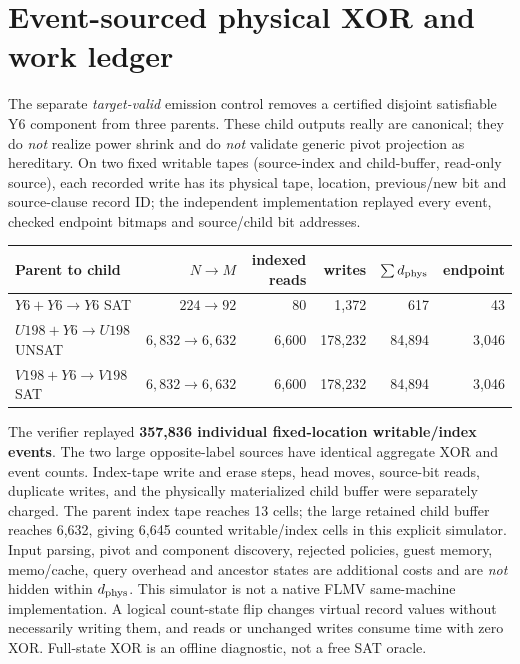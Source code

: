 \documentclass[10pt]{article}
\begin{document}
\section{Event-sourced physical XOR and work ledger}
The separate \emph{target-valid} emission control removes a certified disjoint satisfiable Y6 component from three parents. These child outputs really are canonical; they do \emph{not} realize power shrink and do \emph{not} validate generic pivot projection as hereditary. On two fixed writable tapes (source-index and child-buffer, read-only source), each recorded write has its physical tape, location, previous/new bit and source-clause record ID; the independent implementation replayed every event, checked endpoint bitmaps and source/child bit addresses.
\begin{center}\begin{tabular}{lrrrrr}\toprule
Parent to child & $N\to M$ & indexed reads & writes & $\sum d_{\rm phys}$ & endpoint\\\midrule
$Y6+Y6\to Y6$ SAT & $224\to92$&80&1,372&617&43\\
$U198+Y6\to U198$ UNSAT &$6,832\to6,632$&6,600&178,232&84,894&3,046\\
$V198+Y6\to V198$ SAT &$6,832\to6,632$&6,600&178,232&84,894&3,046\\\bottomrule\end{tabular}\end{center}
\noindent The verifier replayed \textbf{357,836 individual fixed-location writable/index events}. The two large opposite-label sources have identical aggregate XOR and event counts. Index-tape write and erase steps, head moves, source-bit reads, duplicate writes, and the physically materialized child buffer were separately charged. The parent index tape reaches 13 cells; the large retained child buffer reaches 6,632, giving 6,645 counted writable/index cells in this explicit simulator. Input parsing, pivot and component discovery, rejected policies, guest memory, memo/cache, query overhead and ancestor states are additional costs and are \emph{not} hidden within $d_{\rm phys}$. This simulator is not a native FLMV same-machine implementation. A logical count-state flip changes virtual record values without necessarily writing them, and reads or unchanged writes consume time with zero XOR. Full-state XOR is an offline diagnostic, not a free SAT oracle.
\end{document}
